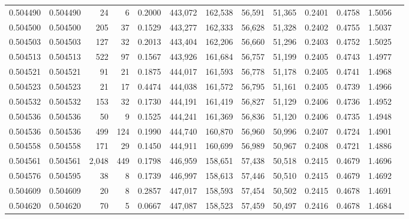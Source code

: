 \begin{tabular}{rrrrrrrrrrrrr}
0.504490 & 0.504490 &    24 &     6 &                                     0.2000 & 443,072 & 162,538 &  56,591 &  51,365 & 0.2401 & 0.4758 & 1.5056 \\
0.504500 & 0.504500 &   205 &    37 &                                     0.1529 & 443,277 & 162,333 &  56,628 &  51,328 & 0.2402 & 0.4755 & 1.5037 \\
0.504503 & 0.504503 &   127 &    32 &                                     0.2013 & 443,404 & 162,206 &  56,660 &  51,296 & 0.2403 & 0.4752 & 1.5025 \\
0.504513 & 0.504513 &   522 &    97 &                                     0.1567 & 443,926 & 161,684 &  56,757 &  51,199 & 0.2405 & 0.4743 & 1.4977 \\
0.504521 & 0.504521 &    91 &    21 &                                     0.1875 & 444,017 & 161,593 &  56,778 &  51,178 & 0.2405 & 0.4741 & 1.4968 \\
0.504523 & 0.504523 &    21 &    17 &                                     0.4474 & 444,038 & 161,572 &  56,795 &  51,161 & 0.2405 & 0.4739 & 1.4966 \\
0.504532 & 0.504532 &   153 &    32 &                                     0.1730 & 444,191 & 161,419 &  56,827 &  51,129 & 0.2406 & 0.4736 & 1.4952 \\
0.504536 & 0.504536 &    50 &     9 &                                     0.1525 & 444,241 & 161,369 &  56,836 &  51,120 & 0.2406 & 0.4735 & 1.4948 \\
0.504536 & 0.504536 &   499 &   124 &                                     0.1990 & 444,740 & 160,870 &  56,960 &  50,996 & 0.2407 & 0.4724 & 1.4901 \\
0.504558 & 0.504558 &   171 &    29 &                                     0.1450 & 444,911 & 160,699 &  56,989 &  50,967 & 0.2408 & 0.4721 & 1.4886 \\
0.504561 & 0.504561 & 2,048 &   449 &                                     0.1798 & 446,959 & 158,651 &  57,438 &  50,518 & 0.2415 & 0.4679 & 1.4696 \\
0.504576 & 0.504595 &    38 &     8 &                                     0.1739 & 446,997 & 158,613 &  57,446 &  50,510 & 0.2415 & 0.4679 & 1.4692 \\
0.504609 & 0.504609 &    20 &     8 &                                     0.2857 & 447,017 & 158,593 &  57,454 &  50,502 & 0.2415 & 0.4678 & 1.4691 \\
0.504620 & 0.504620 &    70 &     5 &                                     0.0667 & 447,087 & 158,523 &  57,459 &  50,497 & 0.2416 & 0.4678 & 1.4684 \\

\end{tabular}
